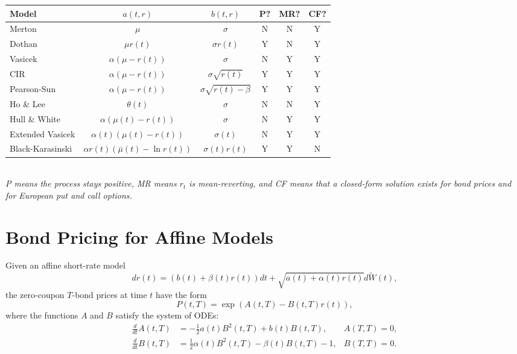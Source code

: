 \documentclass[twocolumn]{amsart}
\newcommand{\tW}{\widetilde W}
\begin{document}
\begin{tabular}{|lccccc|}
\hline
Model & $a(t,r)$ & $b(t,r)$ & P? & MR? & CF? \\
\hline
Merton & $\mu$ & $\sigma$ & N & N & Y \\
Dothan  &  $\mu r(t)$ & $\sigma r(t)$  & Y & N & Y \\
Vasicek  & $\alpha (\mu - r(t))$ & $\sigma$ & N & Y & Y \\
CIR  & $\alpha (\mu - r(t))$ & $\sigma \sqrt{r(t)}$& Y & Y & Y \\
Pearson-Sun & $\alpha(\mu - r(t))$ & $\sigma \sqrt{r(t)-\beta}$ & Y & Y & Y \\
Ho \& Lee &  $\theta(t)$ & $\sigma$  & N & N & Y \\
Hull \& White & $\alpha (\mu(t) - r(t))$ & $\sigma$ & N & Y & Y \\
Extended Vasicek & $\alpha(t) (\mu(t) - r(t))$ & $\sigma(t)$ & N & Y & Y \\
Black-Karasinski & $\alpha r(t) (\bar{\mu}(t) - \ln r(t))$ & $\sigma(t) r(t)$ & Y & Y & N\\
\hline
\end{tabular}\\

\emph{P means the process stays positive, MR means $r_t$ is mean-reverting, and CF means that a closed-form solution exists for bond prices and for European put and call options.}

\section*{Bond Pricing for Affine Models}

Given an affine short-rate model
\begin{equation*}
    dr(t) = (b(t) + \beta(t) r(t))dt+\sqrt{a(t) + \alpha(t) r(t)}d\tW(t),
\end{equation*}
the zero-coupon $T$-bond prices at time $t$ have the form
\begin{equation*}
    P(t,T) = \exp\left( A(t,T) - B(t,T) r(t) \right),
\end{equation*}
where the functions $A$ and $B$ satisfy the system of ODEs:
\begin{equation*}
    \begin{aligned}
        \frac{d}{dt} A(t,T) &= -\frac{1}{2} a(t) B^2(t,T) + b(t) B(t,T), &A(T,T) = 0,\\
        \frac{d}{dt} B(t,T) &= \frac12 \alpha(t) B^2(t,T) - \beta(t) B(t,T) - 1, & B(T,T) = 0.
    \end{aligned}
\end{equation*}
\end{document}
